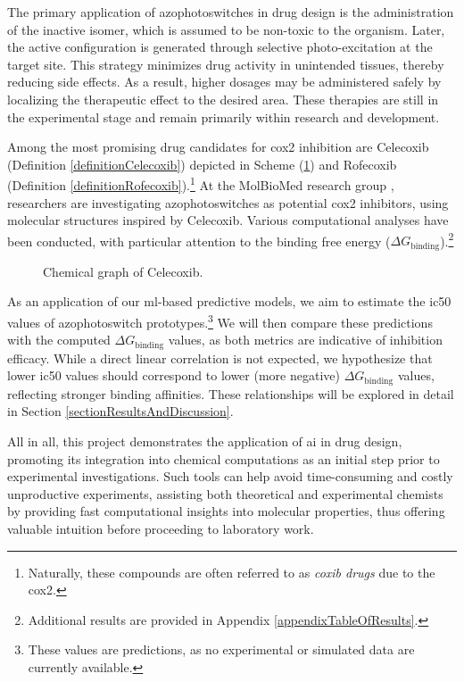 \documentclass[11pt]{article}
\begin{document}
The primary application of azophotoswitches in drug design is the administration of the inactive isomer, which is assumed to be non-toxic to the organism. Later, the active configuration is generated through selective photo-excitation at the target site. This strategy minimizes drug activity in unintended tissues, thereby reducing side effects. As a result, higher dosages may be administered safely by localizing the therapeutic effect to the desired area. These therapies are still in the experimental stage and remain primarily within research and development.

Among the most promising drug candidates for \gls{cox2} inhibition are Celecoxib (Definition \ref{definitionCelecoxib}) depicted in Scheme (\ref{CelecoxibFigure}) and Rofecoxib (Definition \ref{definitionRofecoxib}).\footnote{Naturally, these compounds are often referred to as \emph{coxib drugs} due to the \gls{cox2}.} At the MolBioMed research group \cite{molbiomed}, researchers are investigating azophotoswitches as potential \gls{cox2} inhibitors, using molecular structures inspired by Celecoxib. Various computational analyses have been conducted, with particular attention to the binding free energy ($\Delta G_{\text{binding}}$).\footnote{Additional results are provided in Appendix \ref{appendixTableOfResults}.}

\begin{figure}[H]
\captionsetup{type=scheme}
\centering
{}
\caption{Chemical graph of Celecoxib.}
\label{CelecoxibFigure}
\end{figure}

As an application of our \gls{ml}-based predictive models, we aim to estimate the \gls{ic50} values of azophotoswitch prototypes.\footnote{These values are predictions, as no experimental or simulated data are currently available.} We will then compare these predictions with the computed $\Delta G_{\text{binding}}$ values, as both metrics are indicative of inhibition efficacy. While a direct linear correlation is not expected, we hypothesize that lower \gls{ic50} values should correspond to lower (more negative) $\Delta G_{\text{binding}}$ values, reflecting stronger binding affinities. These relationships will be explored in detail in Section \ref{sectionResultsAndDiscussion}.

All in all, this project demonstrates the application of \gls{ai} in drug design, promoting its integration into chemical computations as an initial step prior to experimental investigations. Such tools can help avoid time-consuming and costly unproductive experiments, assisting both theoretical and experimental chemists by providing fast computational insights into molecular properties, thus offering valuable intuition before proceeding to laboratory work.
\end{document}
